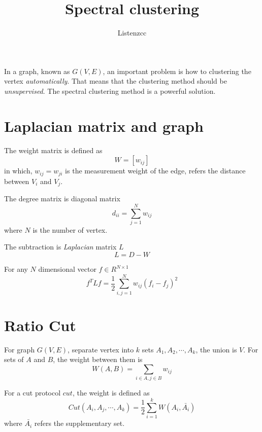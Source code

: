\documentclass[a4paper]{article}
\begin{document}
\title{Spectral clustering}
\author{Listenzcc}
\maketitle

\abstract
In a graph, known as $G(V, E)$, an important problem is how to clustering the vertex \emph{automatically}.
That means that the clustering method should be \emph{unsupervised}.
The spectral clustering method is a powerful solution.

\section{Laplacian matrix and graph}
The weight matrix is defined as
\begin{equation*}
    W = [w_{ij}]
\end{equation*}
in which, $w_{ij}=w_{ji}$ is the measurement weight of the edge, refers the distance between $V_i$ and $V_j$.

The degree matrix is diagonal matrix
\begin{equation*}
    d_{ii} = \sum_{j=1}^{N}w_{ij}
\end{equation*}
where $N$ is the number of vertex.

The subtraction is \emph{Laplacian} matrix $L$
\begin{equation}
    \label{equation: Laplacian matrix}
    L = D - W
\end{equation}

For any $N$ dimensional vector $f \in R^{N \times 1}$
\begin{equation}
    \label{equation: Laplacian matrix times vector}
    f^T L f = \frac{1}{2} \sum_{i, j=1}^{N} w_{ij}(f_i - f_j)^2
\end{equation}

\section{Ratio Cut}
For graph $G(V, E)$, separate vertex into $k$ sets $A_1, A_2, \cdots , A_k$, the union is $V$.
For sets of $A$ and $B$, the weight between them is
\begin{equation*}
    W(A, B) = \sum_{i \in A, j \in B} w_{ij}
\end{equation*}

For a cut protocol $cut$, the weight is defined as
\begin{equation}
    \label{equation:Loss of cut}
    Cut(A_i, A_j, \cdots, A_k) = \frac{1}{2} \sum_{i=1}^{k} W(A_i, \bar{A_i})
\end{equation}
where $\bar{A_i}$ refers the supplementary set.
\end{document}
